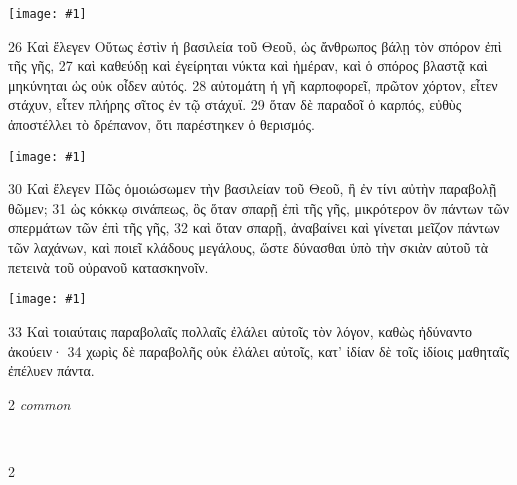 \documentclass[10pt,a5paper,twoside,twocolumn]{book}
\newcommand{\fig}[1]{\texttt{[image: \#1]}\label{fig:#1}}
\newcommand*\cleartoleftpage{%
  \ifodd\value{page}\hbox{}\clearpage\fi
}
\newcommand{\separator}{
  \vspace{-0.5\baselineskip}%
  \hspace{0.27\textwidth}%
  \noindent\makebox[\linewidth]{\resizebox{0.3333\linewidth}{1pt}{$\bullet$}}\bigskip%
  \vspace{-0.5\baselineskip}
}
\newcommand{\sceneseparator}{%
  \vspace{-0.7\baselineskip}%
  \hspace{-0.01\textwidth}\noindent\makebox[\linewidth]{\resizebox{0.15\linewidth}{1pt}{$\bullet$}}%
  \vspace{-0.2\baselineskip}
}
\newenvironment{facing}{\cleartoleftpage}{\clearpage\pagebreak}
\newenvironment{help}{\clearpage}{}
\newenvironment{helpsec}{\begin{minipage}[t]{\textwidth}\begin{multicols}{2}}{\end{multicols}\end{minipage}}
\newenvironment{vocab}{\begin{helpsec}}{\end{helpsec}}
\newenvironment{translation}{\separator\\\begin{helpsec}\footnotesize}{\end{helpsec}}
\begin{document}
\begin{facing}

\fig{04-26} %

26 Καὶ ἔλεγεν Οὕτως ἐστὶν ἡ βασιλεία τοῦ Θεοῦ, ὡς ἄνθρωπος βάλῃ τὸν σπόρον ἐπὶ τῆς γῆς, 27 καὶ καθεύδῃ καὶ ἐγείρηται νύκτα καὶ ἡμέραν, καὶ ὁ σπόρος βλαστᾷ καὶ μηκύνηται ὡς οὐκ οἶδεν αὐτός. 28 αὐτομάτη ἡ γῆ καρποφορεῖ, πρῶτον χόρτον, εἶτεν στάχυν, εἶτεν πλήρης σῖτος ἐν τῷ στάχυϊ. 29 ὅταν δὲ παραδοῖ ὁ καρπός, εὐθὺς ἀποστέλλει τὸ δρέπανον, ὅτι παρέστηκεν ὁ θερισμός. 

\fig{04-28} %

30 Καὶ ἔλεγεν Πῶς ὁμοιώσωμεν τὴν βασιλείαν τοῦ Θεοῦ, ἢ ἐν τίνι αὐτὴν παραβολῇ θῶμεν; 31 ὡς κόκκῳ σινάπεως, ὃς ὅταν σπαρῇ ἐπὶ τῆς γῆς, μικρότερον ὂν πάντων τῶν σπερμάτων τῶν ἐπὶ τῆς γῆς, 32 καὶ ὅταν σπαρῇ, ἀναβαίνει καὶ γίνεται μεῖζον πάντων τῶν λαχάνων, καὶ ποιεῖ κλάδους μεγάλους, ὥστε δύνασθαι ὑπὸ τὴν σκιὰν αὐτοῦ τὰ πετεινὰ τοῦ οὐρανοῦ κατασκηνοῖν. 

\vfill

\fig{04-30} %

\vfill

\sceneseparator

\vfill

33 Καὶ τοιαύταις παραβολαῖς πολλαῖς ἐλάλει αὐτοῖς τὸν λόγον, καθὼς ἠδύναντο ἀκούειν· 34 χωρὶς δὲ παραβολῆς οὐκ ἐλάλει αὐτοῖς, κατ’ ἰδίαν δὲ τοῖς ἰδίοις μαθηταῖς ἐπέλυεν πάντα.


\begin{help}
\begin{vocab}
\emph{common}\\

\end{vocab}
\begin{translation}

\end{translation}
\end{help}
\end{facing}

\end{document}

